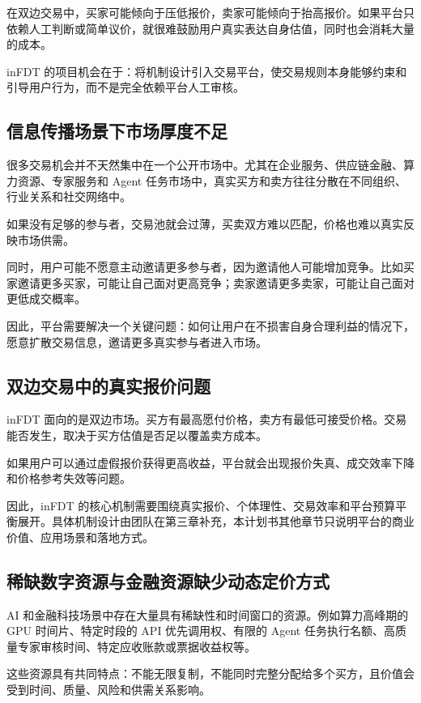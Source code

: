 \documentclass[UTF8,a4paper,12pt]{ctexart}
\begin{document}
在双边交易中，买家可能倾向于压低报价，卖家可能倾向于抬高报价。如果平台只依赖人工判断或简单议价，就很难鼓励用户真实表达自身估值，同时也会消耗大量的成本。

inFDT 的项目机会在于：将机制设计引入交易平台，使交易规则本身能够约束和引导用户行为，而不是完全依赖平台人工审核。

\subsection{信息传播场景下市场厚度不足}

很多交易机会并不天然集中在一个公开市场中。尤其在企业服务、供应链金融、算力资源、专家服务和 Agent 任务市场中，真实买方和卖方往往分散在不同组织、行业关系和社交网络中。

如果没有足够的参与者，交易池就会过薄，买卖双方难以匹配，价格也难以真实反映市场供需。

同时，用户可能不愿意主动邀请更多参与者，因为邀请他人可能增加竞争。比如买家邀请更多买家，可能让自己面对更高竞争；卖家邀请更多卖家，可能让自己面对更低成交概率。

因此，平台需要解决一个关键问题：如何让用户在不损害自身合理利益的情况下，愿意扩散交易信息，邀请更多真实参与者进入市场。

\subsection{双边交易中的真实报价问题}

inFDT 面向的是双边市场。买方有最高愿付价格，卖方有最低可接受价格。交易能否发生，取决于买方估值是否足以覆盖卖方成本。

如果用户可以通过虚假报价获得更高收益，平台就会出现报价失真、成交效率下降和价格参考失效等问题。

因此，inFDT 的核心机制需要围绕真实报价、个体理性、交易效率和平台预算平衡展开。具体机制设计由团队在第三章补充，本计划书其他章节只说明平台的商业价值、应用场景和落地方式。

\subsection{稀缺数字资源与金融资源缺少动态定价方式}

AI 和金融科技场景中存在大量具有稀缺性和时间窗口的资源。例如算力高峰期的 GPU 时间片、特定时段的 API 优先调用权、有限的 Agent 任务执行名额、高质量专家审核时间、特定应收账款或票据收益权等。

这些资源具有共同特点：不能无限复制，不能同时完整分配给多个买方，且价值会受到时间、质量、风险和供需关系影响。
\end{document}
